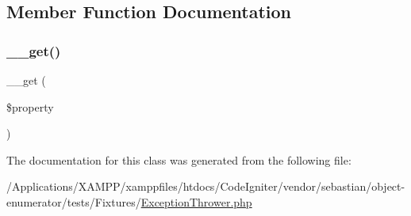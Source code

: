 \subsection{Member Function Documentation}
\mbox{\label{class_sebastian_bergmann_1_1_object_enumerator_1_1_fixtures_1_1_exception_thrower_a6481e8cfc93c80885b3d72a6e1f15a1f}} 
\subsubsection{\texorpdfstring{\+\_\+\+\_\+get()}{\_\_get()}}
{\footnotesize\ttfamily \+\_\+\+\_\+get (\begin{DoxyParamCaption}\item[{}]{\$property }\end{DoxyParamCaption})}



The documentation for this class was generated from the following file\+:\begin{DoxyCompactItemize}
\item 
/\+Applications/\+X\+A\+M\+P\+P/xamppfiles/htdocs/\+Code\+Igniter/vendor/sebastian/object-\/enumerator/tests/\+Fixtures/\mbox{\hyperlink{_exception_thrower_8php}{Exception\+Thrower.\+php}}\end{DoxyCompactItemize}
